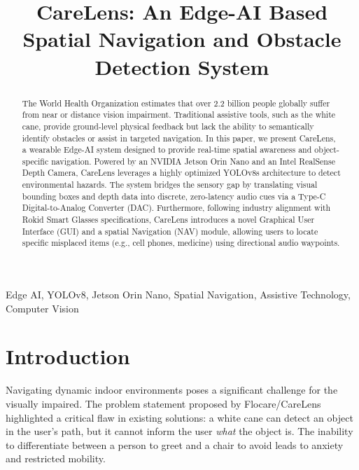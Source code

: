 \documentclass[conference]{IEEEtran}
\begin{document}
\title{CareLens: An Edge-AI Based Spatial Navigation and Obstacle Detection System\\
}

\author{
}

\maketitle

\begin{abstract}
The World Health Organization estimates that over 2.2 billion people globally suffer from near or distance vision impairment. Traditional assistive tools, such as the white cane, provide ground-level physical feedback but lack the ability to semantically identify obstacles or assist in targeted navigation. In this paper, we present CareLens, a wearable Edge-AI system designed to provide real-time spatial awareness and object-specific navigation. Powered by an NVIDIA Jetson Orin Nano and an Intel RealSense Depth Camera, CareLens leverages a highly optimized YOLOv8s architecture to detect environmental hazards. The system bridges the sensory gap by translating visual bounding boxes and depth data into discrete, zero-latency audio cues via a Type-C Digital-to-Analog Converter (DAC). Furthermore, following industry alignment with Rokid Smart Glasses specifications, CareLens introduces a novel Graphical User Interface (GUI) and a spatial Navigation (NAV) module, allowing users to locate specific misplaced items (e.g., cell phones, medicine) using directional audio waypoints.
\end{abstract}

\begin{IEEEkeywords}
Edge AI, YOLOv8, Jetson Orin Nano, Spatial Navigation, Assistive Technology, Computer Vision
\end{IEEEkeywords}

\section{Introduction}
Navigating dynamic indoor environments poses a significant challenge for the visually impaired. The problem statement proposed by Flocare/CareLens highlighted a critical flaw in existing solutions: a white cane can detect an object in the user's path, but it cannot inform the user \textit{what} the object is. The inability to differentiate between a person to greet and a chair to avoid leads to anxiety and restricted mobility.
\end{document}
